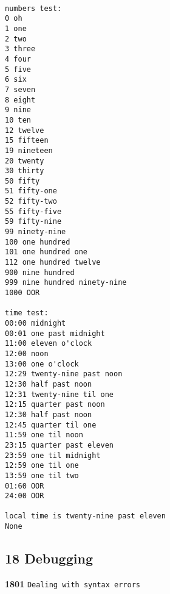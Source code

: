 \documentclass[11pt]{article}
\begin{document}
    \begin{Verbatim}[commandchars=\\\{\}]

numbers test:
0 oh
1 one
2 two
3 three
4 four
5 five
6 six
7 seven
8 eight
9 nine
10 ten
12 twelve
15 fifteen
19 nineteen
20 twenty
30 thirty
50 fifty
51 fifty-one
52 fifty-two
55 fifty-five
59 fifty-nine
99 ninety-nine
100 one hundred
101 one hundred one
112 one hundred twelve
900 nine hundred
999 nine hundred ninety-nine
1000 OOR

time test:
00:00 midnight
00:01 one past midnight
11:00 eleven o'clock
12:00 noon
13:00 one o'clock
12:29 twenty-nine past noon
12:30 half past noon
12:31 twenty-nine til one
12:15 quarter past noon
12:30 half past noon
12:45 quarter til one
11:59 one til noon
23:15 quarter past eleven
23:59 one til midnight
12:59 one til one
13:59 one til two
01:60 OOR
24:00 OOR

local time is twenty-nine past eleven
None

    \end{Verbatim}

    \hypertarget{debugging}{%
\subsection{18 Debugging}\label{debugging}}

    \textbf{1801} \texttt{Dealing\ with\ syntax\ errors}
\end{document}
